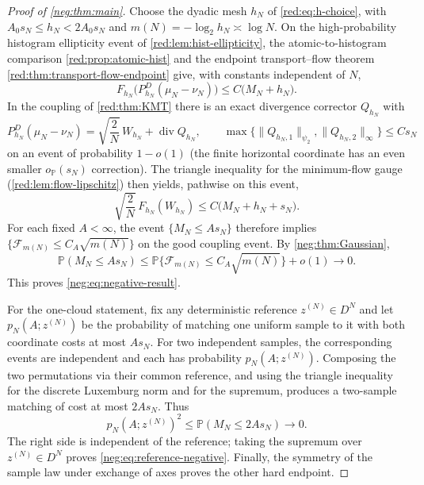 \documentclass[11pt]{article}
\theoremstyle{definition}
\theoremstyle{remark}
\numberwithin{equation}{section}
\begin{document}
\begin{proof}[Proof of \cref{neg:thm:main}]
Choose the dyadic mesh $h_N$ of \eqref{red:eq:h-choice}, with
$A_0s_N\le h_N<2A_0s_N$ and
$m(N)=-\log_2h_N\asymp\log N$. On the high-probability histogram
ellipticity event of \cref{red:lem:hist-ellipticity}, the
atomic-to-histogram comparison \cref{red:prop:atomic-hist} and the
endpoint transport--flow theorem \cref{red:thm:transport-flow-endpoint}
give, with constants independent of $N$,
\begin{equation}\label{neg:eq:eventwise-matching}
 F_{h_N}\big(P_{h_N}^D(\mu_N-\nu_N)\big)
 \le C\big(M_N+h_N\big).
\end{equation}
In the coupling of \cref{red:thm:KMT} there is an exact divergence
corrector $Q_{h_N}$ with
\begin{equation}\label{neg:eq:eventwise-KMT}
 P_{h_N}^D(\mu_N-\nu_N)
   =\sqrt{\frac2N}\,W_{h_N}+\operatorname{div}Q_{h_N},
 \qquad\max\{\|Q_{h_N,1}\|_{\psi_2},\|Q_{h_N,2}\|_\infty\}
       \le C s_N
\end{equation}
on an event of probability $1-o(1)$ (the finite horizontal
coordinate has an even smaller $o_{\mathbb P}(s_N)$ correction).
The triangle inequality for the minimum-flow gauge
(\cref{red:lem:flow-lipschitz}) then yields, pathwise on this event,
\begin{equation}\label{neg:eq:transfer}
 \sqrt{\frac2N}\,F_{h_N}(W_{h_N})
 \le C\big(M_N+h_N+s_N\big).
\end{equation}
For each fixed $A<\infty$, the event $\{M_N\le As_N\}$ therefore
implies $\{\mathcal F_{m(N)}\le C_A\sqrt{m(N)}\}$ on the good
coupling event. By \cref{neg:thm:Gaussian},
\[
 \mathbb P(M_N\le As_N)
 \le\mathbb P\{\mathcal F_{m(N)}\le C_A\sqrt{m(N)}\}+o(1)
 \longrightarrow0.
\]
This proves \eqref{neg:eq:negative-result}.

For the one-cloud statement, fix any deterministic
reference $z^{(N)}\in D^N$ and let $p_N(A;z^{(N)})$ be the probability
of matching one uniform sample to it with both coordinate costs at
most $As_N$.
For two independent samples, the corresponding events are
independent and each has probability $p_N(A;z^{(N)})$. Composing the two
permutations via their common reference, and using the triangle
inequality for the discrete Luxemburg norm and for the supremum,
produces a two-sample matching of cost at most $2As_N$. Thus
\[
 p_N(A;z^{(N)})^2\le\mathbb P(M_N\le2As_N)\longrightarrow0.
\]
The right side is independent of the reference; taking the
supremum over $z^{(N)}\in D^N$ proves
\eqref{neg:eq:reference-negative}. Finally, the symmetry of the
sample law under exchange of axes proves the other hard endpoint.
\end{proof}
\clearpage
{}
{}
\appendix
\end{document}
